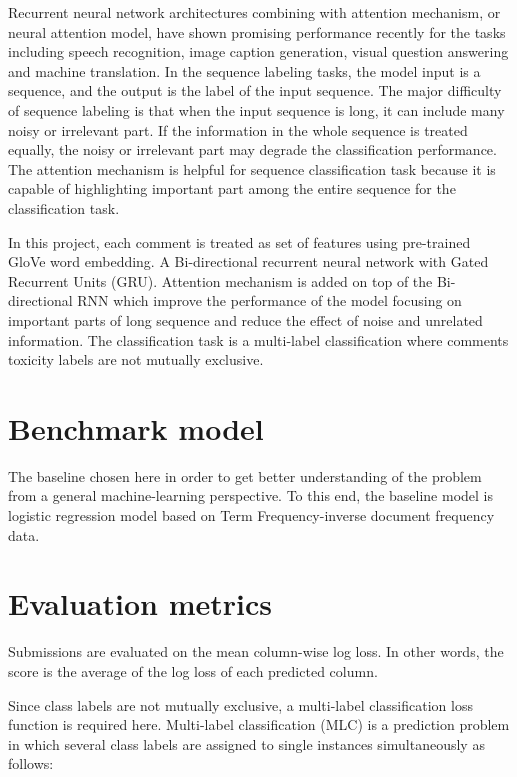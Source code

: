 \documentclass{article}
\begin{document}
Recurrent neural network architectures combining with attention mechanism,
or neural attention model, have shown promising performance recently for
the tasks including speech recognition, image caption generation,
visual question answering and machine translation. 
In the sequence labeling tasks,
the model input is a sequence, and the output is the label of the
input sequence. The major difficulty of sequence labeling is that when
the input sequence is long, it can include many noisy or irrelevant part.
If the information in the whole sequence is treated equally, the noisy or
irrelevant part may degrade the classification performance.
The attention mechanism is helpful for sequence classification task because
it is capable of highlighting important part among the entire sequence for
the classification task.



In this project, each comment is treated as set of features using pre-trained GloVe word embedding. A Bi-directional recurrent neural network with Gated Recurrent Units (GRU). Attention mechanism is added on top of the Bi-directional RNN which improve the performance of the model focusing on important parts of long sequence and reduce the effect of noise and unrelated information. The classification task is a multi-label classification where comments toxicity labels are not mutually exclusive.


\section{Benchmark model}

The baseline chosen here in order to get better understanding of the problem from a general machine-learning perspective. To this end, the baseline model is logistic regression model based on Term Frequency-inverse document frequency data. 

\section{Evaluation metrics}

Submissions are evaluated on the mean column-wise log loss. In other words, the score is the average of the log loss of each predicted column.


Since class labels are not mutually exclusive, a multi-label classification loss function is required here. Multi-label classification (MLC) is a prediction problem in which several class labels are assigned to single instances simultaneously as follows:
\end{document}
